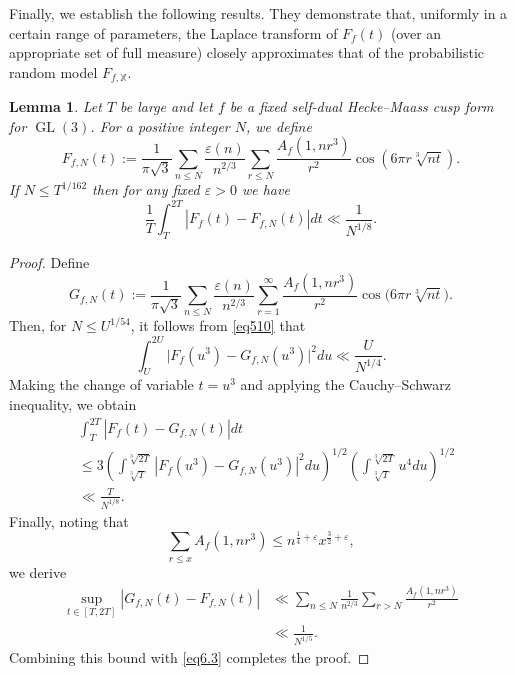 \documentclass[10pt,leqno]{amsart}
\numberwithin{equation}{section}
\newtheorem{lemma}[definition]{{Lemma}}
\begin{document}
Finally, we establish the following results. They demonstrate that, uniformly in a certain range of parameters, the Laplace transform of $F_f(t)$ (over an appropriate set of full measure) closely approximates that of the probabilistic random model $F_{f,\mathbb{X}}$.
\begin{lemma}\label{le6.4}
    Let $T$ be large and let $f$ be a fixed self-dual Hecke--Maass cusp form for $\operatorname{GL}(3)$. For a positive integer $N$, we define
\[
F_{f,N}(t):=\frac{1}{\pi \sqrt{3}} \sum_{n \leqslant N} \frac{\varepsilon(n)}{n^{2/3}} \sum_{r \leqslant N} \frac{A_f\left(1,n r^3\right)}{r^{ 2}} \cos \left(6 \pi r \sqrt[3]{n t}\right).
\]
If $N \leqslant T^{1 /162}$ then for any fixed $\varepsilon>0$ we have
\[
\frac{1}{T} \int_T^{2 T}\left|F_f(t)-F_{f,N}(t)\right| d t \ll \frac{1}{N^{1 / 8}}.
\]
\end{lemma}

\begin{proof}
Define
\[
G_{f,N}(t) := \frac{1}{\pi \sqrt{3}} \sum_{n \leqslant N} \frac{\varepsilon(n)}{n^{2/3}} \sum_{r=1}^{\infty} \frac{A_f(1, n r^3)}{r^{2}} \cos\bigl(6\pi r \sqrt[3]{n t}\bigr).
\]
Then, for $N \le U^{1/54}$, it follows from \eqref{eq510} that
\begin{equation}\label{eq6.2}
\int_{U}^{2U} \bigl| F_f(u^{3}) - G_{f,N}(u^{3}) \bigr|^{2}   du \ll\frac{U}{N^{1/4}}.
\end{equation}
Making the change of variable $t = u^{3}$ and applying the Cauchy--Schwarz inequality, we obtain
\begin{equation}\label{eq6.3}
\begin{aligned}
&\int_T^{2 T}\left|F_f(t)-G_{f,N}(t)\right| d t \\
& \leq 3\left(\int_{\sqrt[3]{T}}^{\sqrt[3]{2 T}}\left|F_f\left(u^3\right)-G_{f,N}\left(u^3\right)\right|^2 d u\right)^{1 / 2}\left(\int_{\sqrt[3]{T}}^{\sqrt[3]{2 T}} u^4 d u\right)^{1 / 2} \\
& \ll\frac{T}{N^{1 / 8}}.
\end{aligned}
\end{equation}
Finally, noting that
\[
 \sum_{r\leqslant x}A_f(1,nr^3) \leqslant n^{\frac{1}{4}+\varepsilon}x^{\frac{3}{2}+\varepsilon},
\]
 we derive
\[
\begin{aligned}
\sup _{t \in[T, 2 T]}\left|G_{f,N}(t)-F_{f,N}(t)\right| & \ll \sum_{n \leq N} \frac{1}{n^{2 / 3}} \sum_{r>N} \frac{A_f\left(1,n r^3\right)}{r^{ 2}} \\
&  \ll \frac{1}{N^{1 / 5}} .
\end{aligned}
\]
Combining this bound with \eqref{eq6.3} completes the proof.
\end{proof}
\end{document}
